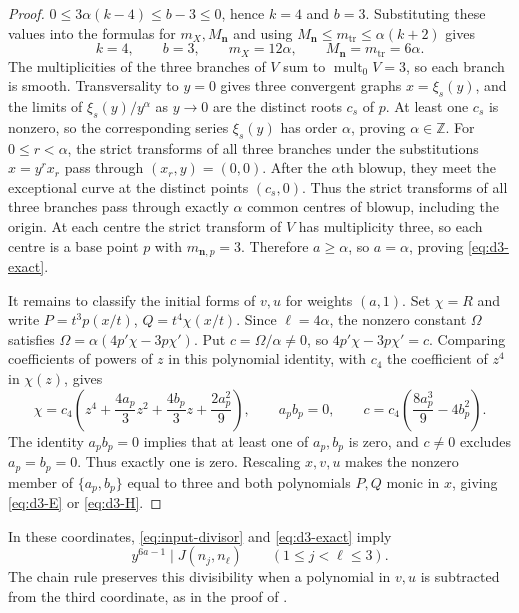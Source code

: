 \documentclass[11pt,letterpaper]{article}
\numberwithin{equation}{section}
\theoremstyle{remark}
\theoremstyle{plain}
\newcommand{\Z}{\mathbb{Z}}
\newcommand{\mult}{\operatorname{mult}}
\begin{document}
\begin{proof}
$0\leq3\alpha(k-4)\leq b-3\leq0$, hence $k=4$ and $b=3$.
Substituting these values into the formulas for $m_X,M_{\boldsymbol n}$
and using $M_{\boldsymbol n}\leq m_{\mathrm{tr}}\leq\alpha(k+2)$ gives
\[
 k=4,\qquad b=3,\qquad m_X=12\alpha,
 \qquad M_{\boldsymbol n}=m_{\mathrm{tr}}=6\alpha.
\]
The multiplicities of the three branches of $V$ sum to $\mult_0V=3$,
so each branch is smooth.  Transversality to $y=0$ gives three convergent
graphs $x=\xi_s(y)$, and the limits of $\xi_s(y)/y^\alpha$ as $y\to0$ are the distinct roots
$c_s$ of $p$.  At least one $c_s$ is nonzero, so the corresponding
series $\xi_s(y)$ has order $\alpha$, proving $\alpha\in\Z$.
For $0\leq r<\alpha$, the strict transforms of all three branches under the
substitutions $x=y^r x_r$ pass through $(x_r,y)=(0,0)$.
After the $\alpha$th blowup, they meet the exceptional curve at
the distinct points $(c_s,0)$.
Thus the strict transforms of all three branches pass through exactly
$\alpha$ common centres of blowup, including the origin.  At each centre
the strict transform of $V$ has multiplicity three, so each centre is a
base point $p$ with $m_{\boldsymbol n,p}=3$.
Therefore $a\geq\alpha$, so $a=\alpha$, proving
\eqref{eq:d3-exact}.

It remains to classify the initial forms of $v,u$ for weights $(a,1)$.
Set $\chi=R$
and write $P=t^3p(x/t)$, $Q=t^4\chi(x/t)$.
Since $\ell=4\alpha$, the nonzero constant $\Omega$ satisfies
$\Omega=\alpha(4p'\chi-3p\chi')$.
Put $c=\Omega/\alpha\neq0$, so $4p'\chi-3p\chi'=c$.
Comparing coefficients of powers of $z$ in this polynomial identity,
with $c_4$ the coefficient of $z^4$ in $\chi(z)$, gives
\[
 \chi=c_4\left(z^4+\frac{4a_p}{3}z^2+\frac{4b_p}{3}z
                      +\frac{2a_p^2}{9}\right),\qquad
 a_pb_p=0,\qquad
 c=c_4\left(\frac{8a_p^3}{9}-4b_p^2\right).
\]
The identity $a_pb_p=0$ implies that at least one of $a_p,b_p$ is zero,
and $c\neq0$ excludes $a_p=b_p=0$.  Thus exactly one is zero.
Rescaling $x,v,u$ makes the nonzero member of $\{a_p,b_p\}$
equal to three and both polynomials $P,Q$ monic in $x$, giving
\eqref{eq:d3-E} or \eqref{eq:d3-H}.
\end{proof}

In these coordinates, \eqref{eq:input-divisor} and
\eqref{eq:d3-exact} imply
\begin{equation}
 y^{6a-1}\mid J(n_j,n_\ell)
 \qquad(1\leq j<\ell\leq3).                          \label{eq:d3-minors}
\end{equation}
The chain rule preserves this divisibility when a polynomial in $v,u$
is subtracted from the third coordinate, as in the proof of
.
\end{document}
